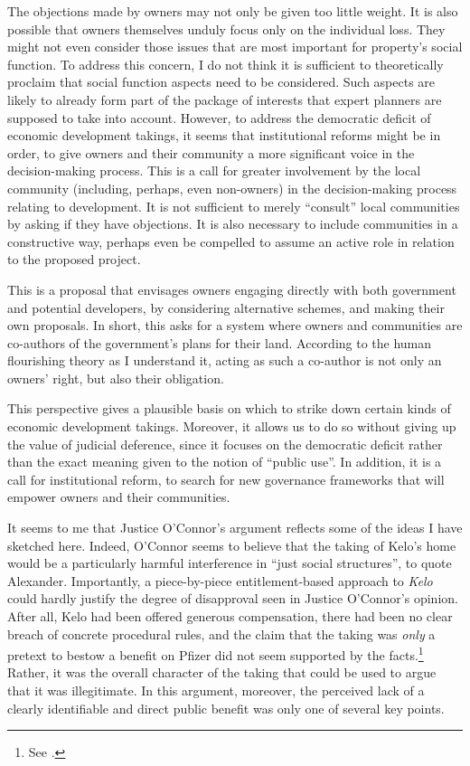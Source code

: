 The objections made by owners may not only be given too little weight. It is also possible that owners themselves unduly focus only on the individual loss. They might not even consider those issues that are most important for property's social function. To address this concern, I do not think it is sufficient to theoretically proclaim that social function aspects need to be considered. Such aspects are likely to already form part of the package of interests that expert planners are supposed to take into account. However, to address the democratic deficit of economic development takings, it seems that institutional reforms might be in order, to give owners and their community a more significant voice in the decision-making process. This is a call for greater involvement by the local community (including, perhaps, even non-owners) in the decision-making process relating to development. It is not sufficient to merely ``consult'' local communities by asking if they have objections. It is also necessary to include communities in a constructive way, perhaps even be compelled to assume an active role in relation to the proposed project.

This is a proposal that envisages owners engaging directly with both government and potential developers, by considering alternative schemes, and making their own proposals. In short, this asks for a system where owners and communities are co-authors of the government's plans for their land.  According to the human flourishing theory as I understand it, acting as such a co-author is not only an owners' right, but also their obligation. 

This perspective gives a plausible basis on which to strike down certain kinds of economic development takings. Moreover, it allows us to do so without giving up the value of judicial deference, since it focuses on the democratic deficit rather than the exact meaning given to the notion of ``public use''. In addition, it is a call for institutional reform, to search for new governance frameworks that will empower owners and their communities.

It seems to me that Justice O'Connor's argument reflects some of the ideas I have sketched here. Indeed, O'Connor seems to believe that the taking of Kelo's home would be a particularly harmful interference in ``just social structures'', to quote Alexander. Importantly, a piece-by-piece entitlement-based approach to {\it Kelo} could hardly justify the degree of disapproval seen in Justice O'Connor's opinion. After all, Kelo had been offered generous compensation, there had been no clear breach of concrete procedural rules, and the claim that the taking was {\it only} a pretext to bestow a benefit on Pfizer did not seem supported by the facts.\footnote{See \cite{bell06}.} Rather, it was the overall character of the taking that could be used to argue that it was illegitimate. In this argument, moreover, the perceived lack of a clearly identifiable and direct public benefit was only one of several key points.

